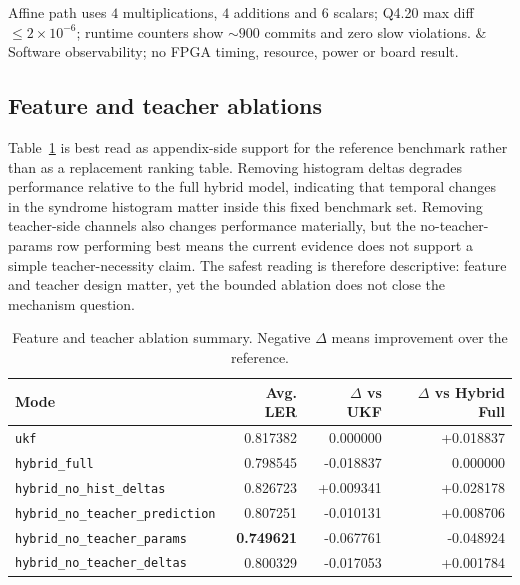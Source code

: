 \documentclass[11pt]{article}
\begin{document}
\begin{table}[ht]
\begin{tabular}
Affine path uses \(4\) multiplications, \(4\) additions and \(6\) scalars;
Q4.20 max diff \(\le2{\times}10^{-6}\); runtime counters show \(\sim900\)
commits and zero slow violations. &
Software observability; no FPGA timing, resource, power or board result. \\
\bottomrule
\end{tabular}
\caption{Numerically expanded synchronization map for the submission-draft
result layer.  The note does not reproduce the larger rendered figures, but it
now imports the main quantitative anchors behind the performance, ablation,
calibration, stress, surrogate-channel and runtime panels in compact form.}
\label{tab:figure-result-sync-note}
\end{table}

\subsection{Feature and teacher ablations}

Table~\ref{tab:feature-ablation} is best read as appendix-side support for the
reference benchmark rather than as a replacement ranking table.  Removing
histogram deltas degrades performance relative to the full hybrid model,
indicating that temporal changes in the syndrome histogram matter inside this
fixed benchmark set.  Removing teacher-side channels also changes performance
materially, but the no-teacher-params row performing best means the current
evidence does not support a simple teacher-necessity claim.  The safest
reading is therefore descriptive: feature and teacher design matter, yet the
bounded ablation does not close the mechanism question.

\begin{table}[ht]
\centering
\small
\begin{tabular}{lrrr}
\toprule
Mode & Avg. LER & \(\Delta\) vs UKF & \(\Delta\) vs Hybrid Full \\
\midrule
\texttt{ukf} & 0.817382 & 0.000000 & +0.018837 \\
\texttt{hybrid\_full} & 0.798545 & -0.018837 & 0.000000 \\
\texttt{hybrid\_no\_hist\_deltas} & 0.826723 & +0.009341 & +0.028178 \\
\texttt{hybrid\_no\_teacher\_prediction} & 0.807251 & -0.010131 & +0.008706 \\
\texttt{hybrid\_no\_teacher\_params} & \textbf{0.749621} & -0.067761 & -0.048924 \\
\texttt{hybrid\_no\_teacher\_deltas} & 0.800329 & -0.017053 & +0.001784 \\
\bottomrule
\end{tabular}
\caption{Feature and teacher ablation summary.  Negative
\(\Delta\) means improvement over the reference.}
\label{tab:feature-ablation}
\end{table}
\end{document}
